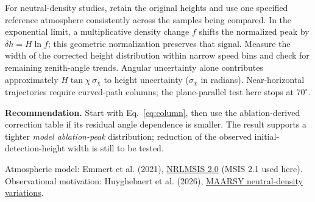 \documentclass[10pt]{article}
\begin{document}
For neutral-density studies, retain the original heights and use one specified
reference atmosphere consistently across the samples being compared. In the
exponential limit, a multiplicative density change $f$ shifts the normalized
peak by $\delta h=H\ln f$; this geometric normalization preserves that signal.
Measure the width of the corrected height distribution within narrow speed
bins and check for remaining zenith-angle trends. Angular uncertainty alone
contributes approximately $H\tan\chi\,\sigma_\chi$ to height uncertainty
($\sigma_\chi$ in radians). Near-horizontal trajectories require curved-path
columns; the plane-parallel test here stops at $70^\circ$.

\textbf{Recommendation.} Start with Eq.~\eqref{eq:column}, then use the
ablation-derived correction table if its residual angle dependence is smaller.
The result supports a tighter \emph{model ablation-peak} distribution;
reduction of the observed initial-detection-height width is still to be tested.

\vspace{2pt}
{\footnotesize Atmospheric model: Emmert et al. (2021),
\href{https://doi.org/10.1029/2020EA001321}{NRLMSIS 2.0} (MSIS 2.1 used here).
Observational motivation: Huyghebaert et al. (2026),
\href{https://doi.org/10.5194/amt-19-4277-2026}{MAARSY neutral-density variations}.}
\end{document}
